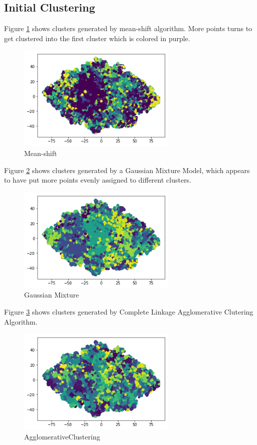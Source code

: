 \documentclass{article} %
\begin{document}
\subsection{Initial Clustering}

Figure \ref{fig:mean-shift} shows clusters generated by mean-shift algorithm.
More points turns to get clustered into the first cluster which is colored in purple.

\begin{figure}[H]
	\centering
	\includegraphics[width=3in]{Figures/ul1.png}
	\caption{Mean-shift}
	\label{fig:mean-shift}
\end{figure}

Figure \ref{fig:gmm} shows clusters generated by a Gaussian Mixture Model,
which appears to have put more points evenly assigned to different clusters.

\begin{figure}[H]
	\centering
	\includegraphics[width=3in]{Figures/ul2.png}
	\caption{Gaussian Mixture}
	\label{fig:gmm}
\end{figure}
	
Figure \ref{fig:agg} shows clusters generated by Complete Linkage Agglomerative Clutering
Algorithm.

\begin{figure}[H]
	\centering
	\includegraphics[width=3in]{Figures/ul3.png}
	\caption{AgglomerativeClustering}
	\label{fig:agg}
\end{figure}
\end{document}
